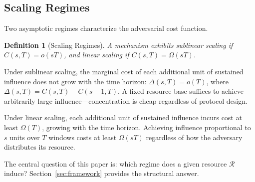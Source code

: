 \documentclass[10pt,journal,compsoc]{IEEEtran}
\newtheorem{definition}[theorem]{Definition}
\theoremstyle{remark}
\begin{document}
	\subsection{Scaling Regimes}
	\label{ssec:regimes}
	
	Two asymptotic regimes characterize the adversarial
	cost function.
	
	\begin{definition}[Scaling Regimes]
		\label{def:regimes}
		A mechanism exhibits \emph{sublinear scaling} if
		$C(s, T) = o(sT)$, and \emph{linear scaling} if
		$C(s, T) = \Omega(sT)$.
	\end{definition}
	
	Under sublinear scaling, the marginal cost of each
	additional unit of sustained influence does not grow
	with the time horizon:
	$\Delta(s, T) = o(T)$,
	where $\Delta(s, T) = C(s, T) - C(s-1, T)$.
	A fixed resource base suffices to achieve arbitrarily
	large influence---concentration is cheap regardless
	of protocol design.
	
	Under linear scaling, each additional unit of sustained
	influence incurs cost at least $\Omega(T)$, growing
	with the time horizon.
	Achieving influence proportional to $s$ units over
	$T$ windows costs at least $\Omega(sT)$ regardless
	of how the adversary distributes its resource.
	
	The central question of this paper is: which regime
	does a given resource $\mathcal{R}$ induce?
	Section~\ref{sec:framework} provides the structural
	answer.
	
\end{document}
